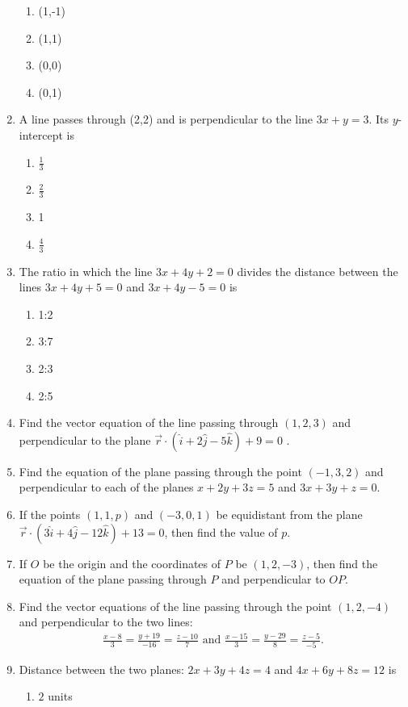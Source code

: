 \begin{enumerate}[label=\thesubsection.\arabic*,ref=\thesubsection.\theenumi]
\begin{enumerate}
\item (1,-1)
\item (1,1)
\item (0,0)
\item (0,1)
\end{enumerate}
\item A line passes through (2,2) and is perpendicular to the line $3x+y=3$. Its $y$-intercept is 
\begin{enumerate}
\item $\frac{1}{3}$
\item $\frac{2}{3}$
\item 1
\item $\frac{4}{3}$
\end{enumerate}
\item The ratio in which the line $3x+4y+2=0$ divides the distance between the lines $3x+4y+5=0$ and $3x+4y-5=0$ is
\begin{enumerate}
\item 1:2
\item 3:7
\item 2:3
\item 2:5
\end{enumerate}
\item Find the vector equation of the line passing through $(1,2,3)$ and perpendicular to the plane $\overrightarrow{r}\cdot(\hat{i}+2\hat{j}-5\hat{k})+9=0$ .
\item Find the equation of the plane passing through the point $(-1,3,2)$ and perpendicular to each of the planes $x+2y+3z=5$ and $3x+3y+z=0$.
\item If the points $(1,1,p)$ and $(-3,0,1)$ be equidistant from the plane $\overrightarrow{r}\cdot(3\hat{i}+4\hat{j}-12\hat{k})+13=0$, then find the value of $p$.
\item If $O$ be the origin and the coordinates of $P$ be $(1,2,-3)$, then find the equation of the plane passing through $P$ and perpendicular to $OP$.
\item Find the vector equations of the line passing through the point $(1,2,-4)$ and perpendicular to the two lines:
\begin{align}
\frac{x-8}{3}=\frac{y+19}{-16}=\frac{z-10}{7}\text{ and } \frac{x-15}{3}=\frac{y-29}{8}=\frac{z-5}{-5}.
\end{align}
\item Distance between the two planes: $2x+3y+4z=4$ and $4x+6y+8z=12$ is \label{prob:22}
\begin{enumerate}
\item $2$ units

\end{enumerate}
\end{enumerate}
